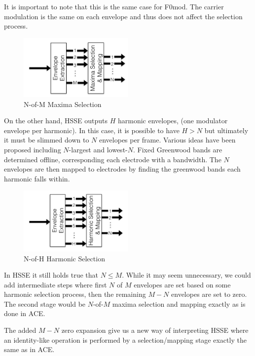 \documentclass [11pt, proquest] {uwthesis}[2015/03/03]
\begin{document}
It is important to note that this is the same case for F0mod.  The carrier modulation is the same on each envelope and thus does not affect the selection process.

\begin{figure}[!ht]
  \centering
    \includegraphics[width=0.5\textwidth]{ACE_selectionTEMP}   
    \caption{N-of-M Maxima Selection}
\end{figure}

On the other hand, HSSE outputs $H$ harmonic envelopes, (one modulator envelope per harmonic).  In this case, it is possible to have $H>N$ but ultimately it must be slimmed down to $N$ envelopes per frame.  Various ideas have been proposed including $N$-largest and lowest-$N$.  Fixed Greenwood bands are determined offline, corresponding each electrode with a bandwidth.  The $N$ envelopes are then mapped to electrodes by finding the greenwood bands each harmonic falls within.

\begin{figure}[!ht]
  \centering
    \includegraphics[width=0.5\textwidth]{HSSE_selection_oldTEMP}   
    \caption{N-of-H Harmonic Selection}
\end{figure}



In HSSE it still holds true that $N \leq M$.  While it may seem unnecessary, we could add intermediate steps where first $N$ of $M$ envelopes are set based on some harmonic selection process, then the remaining $M-N$ envelopes are set to zero.  The second stage would be $N$-of-$M$ maxima selection and mapping exactly as is done in ACE.

The added $M-N$ zero expansion give us a new way of interpreting HSSE where an identity-like operation is performed by a selection/mapping stage exactly the same as in ACE.
\end{document}
